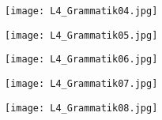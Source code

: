     \begin{figure}[ht!]
      \centering
      \texttt{[image: L4\_Grammatik04.jpg]}
      \caption*{ }
      \label{NJ:fig_L4_Grammatik04}
    \end{figure}
    
    \begin{figure}[ht!]
      \centering
      \texttt{[image: L4\_Grammatik05.jpg]}
      \caption*{ }
      \label{NJ:fig_L4_Grammatik05}
    \end{figure}
    
    \begin{figure}[ht!]
      \centering
      \texttt{[image: L4\_Grammatik06.jpg]}
      \caption*{ }
      \label{NJ:fig_L4_Grammatik06}
    \end{figure}
    
    \begin{figure}[ht!]
      \centering
      \texttt{[image: L4\_Grammatik07.jpg]}
      \caption*{ }
      \label{NJ:fig_L4_Grammatik07}
    \end{figure}
    
    \begin{figure}[ht!]
      \centering
      \texttt{[image: L4\_Grammatik08.jpg]}
      \caption*{ }
      \label{NJ:fig_L4_Grammatik08}
    \end{figure}